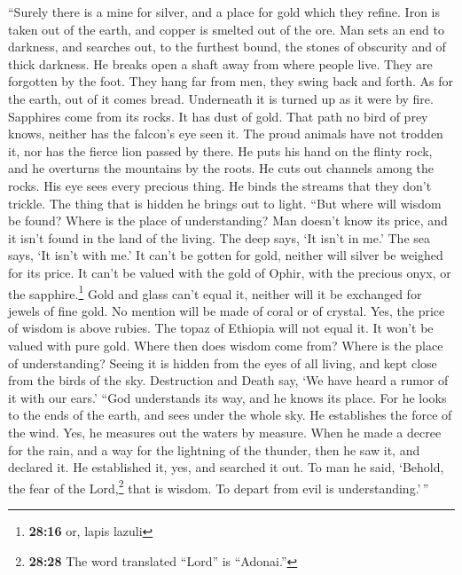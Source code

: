  ``Surely there is a mine for silver, and a place for gold
which they refine.  Iron is taken out of the earth, and
copper is smelted out of the ore.  Man sets an end to
darkness, and searches out, to the furthest bound, the stones of
obscurity and of thick darkness.  He breaks open a shaft
away from where people live. They are forgotten by the foot. They hang
far from men, they swing back and forth.  As for the
earth, out of it comes bread. Underneath it is turned up as it were by
fire.  Sapphires come from its rocks. It has dust of gold.
 That path no bird of prey knows, neither has the falcon's
eye seen it.  The proud animals have not trodden it, nor
has the fierce lion passed by there.  He puts his hand on
the flinty rock, and he overturns the mountains by the roots.
 He cuts out channels among the rocks. His eye sees every
precious thing.  He binds the streams that they don't
trickle. The thing that is hidden he brings out to light.
 ``But where will wisdom be found? Where is the place of
understanding?  Man doesn't know its price, and it isn't
found in the land of the living.  The deep says, `It
isn't in me.' The sea says, `It isn't with me.'  It can't
be gotten for gold, neither will silver be weighed for its price.
 It can't be valued with the gold of Ophir, with the
precious onyx, or the sapphire.\footnote{\textbf{28:16} or, lapis lazuli}
 Gold and glass can't equal it, neither will it be
exchanged for jewels of fine gold.  No mention will be
made of coral or of crystal. Yes, the price of wisdom is above rubies.
 The topaz of Ethiopia will not equal it. It won't be
valued with pure gold.  Where then does wisdom come from?
Where is the place of understanding?  Seeing it is hidden
from the eyes of all living, and kept close from the birds of the sky.
 Destruction and Death say, `We have heard a rumor of it
with our ears.'  ``God understands its way, and he knows
its place.  For he looks to the ends of the earth, and
sees under the whole sky.  He establishes the force of
the wind. Yes, he measures out the waters by measure. 
When he made a decree for the rain, and a way for the lightning of the
thunder,  then he saw it, and declared it. He established
it, yes, and searched it out.  To man he said, `Behold,
the fear of the Lord,\footnote{\textbf{28:28} The word translated
  ``Lord'' is ``Adonai.''} that is wisdom. To depart from evil is
understanding.'\,''

